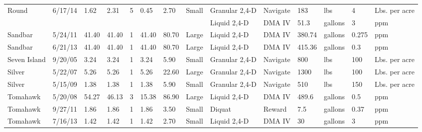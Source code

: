 \documentclass{article}
\begin{document}
\begin{landscape}
\begin{longtable}[l]{lp{14mm}Hp{10mm}HHp{14mm}p{9mm}p{30mm}p{18mm}lp{14mm}p{8mm}l}
  Round & 6/17/14 & 1.62 & 2.31 &   5 & 0.45 & 2.70 & Small & Granular 2,4-D & Navigate & 183 & lbs & 4 & Lbs. per acre \\ 
  & & & & & & & & Liquid 2,4-D & DMA IV & 51.3 & gallons & 3 & ppm \\   
  Sandbar & 5/24/11 & 41.40 & 41.40 &   1 & 41.40 & 80.70 & Large & Liquid 2,4-D & DMA IV & 380.74 & gallons & 0.275 & ppm \\ 
  Sandbar & 6/21/13 & 41.40 & 41.40 &   1 & 41.40 & 80.70 & Large & Liquid 2,4-D & DMA IV & 415.36 & gallons & 0.3 & ppm \\ 
  Seven Island & 9/20/05 & 3.24 & 3.24 &   1 & 3.24 & 5.90 & Small & Granular 2,4-D & Navigate & 800 & lbs & 100 & Lbs. per acre \\ 
  Silver & 5/22/07 & 5.26 & 5.26 &   1 & 5.26 & 22.60 & Large & Granular 2,4-D & Navigate & 1300 & lbs & 100 & Lbs. per acre \\ 
  Silver & 5/15/09 & 1.38 & 1.38 &   1 & 1.38 & 5.90 & Small & Granular 2,4-D & Navigate & 510 & lbs & 150 & Lbs. per acre \\ 
  Tomahawk & 5/20/08 & 54.27 & 46.13 &   3 & 15.38 & 86.90 & Large & Liquid 2,4-D & DMA IV & 489.6 & gallons & 0.5 & ppm \\ 
  Tomahawk & 9/27/11 & 1.86 & 1.86 &   1 & 1.86 & 3.50 & Small & Diquat & Reward & 7.5 & gallons & 0.37 & ppm \\ 
  Tomahawk & 7/16/13 & 1.42 & 1.42 &   1 & 1.42 & 2.70 & Small & Liquid 2,4-D & DMA IV & 30 & gallons & 3 & ppm \\ 


\end{longtable}
\end{landscape}
\end{document}
